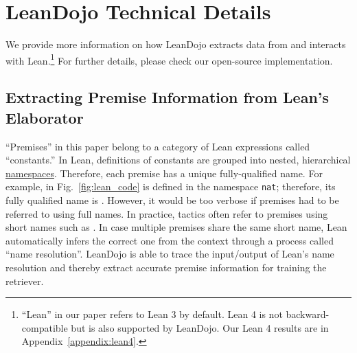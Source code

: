 \setcounter{table}{0}
\renewcommand{\thetable}{\Alph{table}}
\setcounter{figure}{0}
\renewcommand{\thefigure}{\Alph{figure}}
\setcounter{section}{0}
\renewcommand{\thesection}{\Alph{section}}


\section{LeanDojo Technical Details}
\label{appendix:leandojo}

We provide more information on how LeanDojo extracts data from and interacts with Lean.\footnote{``Lean'' in our paper refers to Lean 3 by default. Lean 4 is not backward-compatible but is also supported by LeanDojo. Our Lean 4 results are in Appendix~\ref{appendix:lean4}.} For further details, please check our open-source implementation. 

\subsection{Extracting Premise Information from Lean's Elaborator}
\label{appendix:leandojo:premises}

``Premises'' in this paper belong to a category of Lean expressions called ``constants.'' In Lean, definitions of constants are grouped into nested, hierarchical \href{https://leanprover.github.io/theorem_proving_in_lean/dependent_type_theory.html#namespaces}{namespaces}. Therefore, each premise has a unique fully-qualified name. For example,  in Fig.~\ref{fig:lean_code} is defined in the namespace \texttt{nat}; therefore, its fully qualified name is \texttt{}. However, it would be too verbose if premises had to be referred to using full names. In practice, tactics often refer to premises using short names such as . In case multiple premises share the same short name, Lean automatically infers the correct one from the context through a process called ``name resolution''. LeanDojo is able to trace the input/output of Lean's name resolution and thereby extract accurate premise information for training the retriever.

